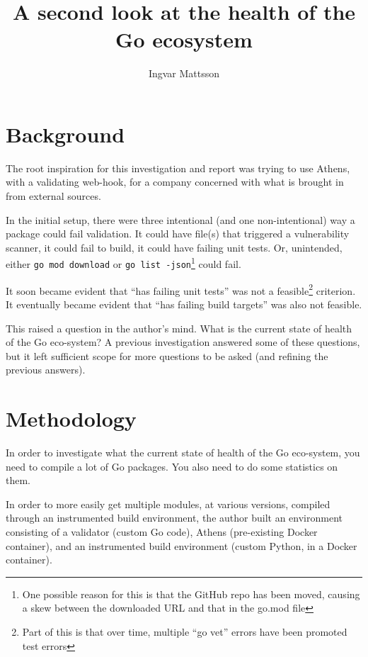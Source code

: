 \documentclass[a4paper]{paper}
\begin{document}
\title{A second look at the health of the Go ecosystem}
\author{Ingvar Mattsson}

\maketitle

\section{Background}

The root inspiration for this investigation and report was trying to
use Athens, with a validating web-hook, for a company concerned with
what is brought in from external sources.

In the initial setup, there were three intentional (and one
non-intentional) way a package could fail validation. It could have
file(s) that triggered a vulnerability scanner, it could fail to
build, it could have failing unit tests. Or, unintended, either {\tt go
mod download} or {\tt go list -json}\footnote{One possible reason for this is that the GitHub repo has been moved, causing a skew between the downloaded URL and that in the go.mod file} could fail.

It soon became evident that ``has failing unit tests'' was not a
feasible\footnote{Part of this is that over time, multiple ``go vet''
  errors have been promoted test errors} criterion. It eventually
became evident that ``has failing build targets'' was also not
feasible.

This raised a question in the author's mind. What is the current state
of health of the Go eco-system? A previous investigation answered some of these questions, but it left sufficient scope for more questions to be asked (and refining the previous answers).

\section{Methodology}

In order to investigate what the current state of health of the Go
eco-system, you need to compile a lot of Go packages. You also need to
do some statistics on them.

In order to more easily get multiple modules, at various versions,
compiled through an instrumented build environment, the author built
an environment consisting of a validator (custom Go code), Athens
(pre-existing Docker container), and an instrumented build environment
(custom Python, in a Docker container).
\end{document}
